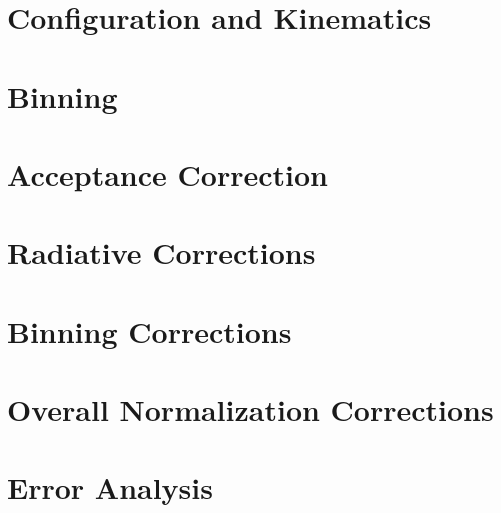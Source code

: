 \section{Configuration and Kinematics}

\section{Binning}

\section{Acceptance Correction}

\section{Radiative Corrections}

\section{Binning Corrections}

\section{Overall Normalization Corrections}

\section{Error Analysis}

